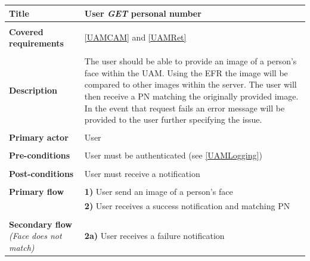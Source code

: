 \documentclass[a4paper,11pt]{article}
\begin{document}
\begin{tabular}{|p{3.5cm}|p{11.5cm}|} \hline
    \textbf{Title} &  User \emph{GET} personal number

    \\ \hline \rowcolor{Gray} & \\ \hline

    \textbf{Covered requirements} &  \ref{UAMCAM} and \ref{UAMRet}

    \\ \hline \rowcolor{Gray} & \\ \hline

    \textbf{Description} &  The user should be able to provide an image of a person's face within the UAM. Using the EFR the image will be compared to other images within the server. The user will then receive a PN matching the originally provided image. In the event that request fails an error message will be provided to the user further specifying the issue.

    \\ \hline \rowcolor{Gray} & \\ \hline

    \textbf{Primary actor} & User

    \\ \hline \rowcolor{Gray} & \\ \hline

    \textbf{Pre-conditions} &   User must be authenticated (see \ref{UAMLogging})

    \\ \hline \rowcolor{Gray} & \\ \hline

    \textbf{Post-conditions} &   User must receive a notification
        
    \\ \hline \rowcolor{Gray} & \\ \hline 
         
    \textbf{Primary flow} & 
    \textbf{1)} User send an image of a person's face \\&
    \textbf{2)} User receives a success notification and matching PN
        
    \\ \hline \rowcolor{Gray} & \\ \hline 
         
    \textbf{Secondary flow} \emph{(Face does not match)} & 
    \textbf{2a)} User receives a failure notification
    
    \\ \hline 
\end{tabular}
\end{document}
